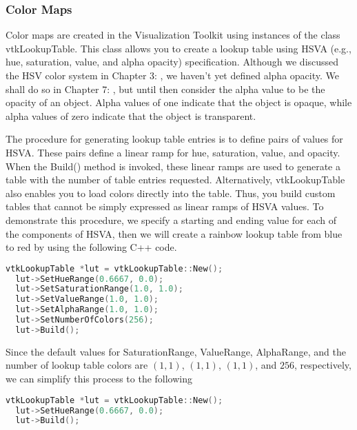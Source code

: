 \begin{description}[leftmargin=0cm,labelindent=0cm]
\end{description}

\subsubsection{Color Maps}

Color maps are created in the Visualization Toolkit using instances of the class vtkLookupTable. This class allows you to create a lookup table using HSVA (e.g., hue, saturation, value, and alpha opacity) specification. Although we discussed the HSV color system in Chapter 3: , we haven't yet defined alpha opacity. We shall do so in Chapter 7:  , but until then consider the alpha value to be the opacity of an object. Alpha values of one indicate that the object is opaque, while alpha values of zero indicate that the object is transparent.

The procedure for generating lookup table entries is to define pairs of values for HSVA. These pairs define a linear ramp for hue, saturation, value, and opacity. When the Build() method is invoked, these linear ramps are used to generate a table with the number of table entries requested. Alternatively, vtkLookupTable also enables you to load colors directly into the table. Thus, you build custom tables that cannot be simply expressed as linear ramps of HSVA values. To demonstrate this procedure, we specify a starting and ending value for each of the components of HSVA, then we will create a rainbow lookup table from blue to red by using the following C++ code.

\begin{lstlisting}[language=C++, caption={Create a rainbow lookup table.}]
vtkLookupTable *lut = vtkLookupTable::New();
  lut->SetHueRange(0.6667, 0.0);
  lut->SetSaturationRange(1.0, 1.0);
  lut->SetValueRange(1.0, 1.0);
  lut->SetAlphaRange(1.0, 1.0);
  lut->SetNumberOfColors(256);
  lut->Build();
\end{lstlisting}

Since the default values for SaturationRange, ValueRange, AlphaRange, and the number of lookup table colors are $(1,1)$, $(1,1)$, $(1,1)$, and $256$, respectively, we can simplify this process to the following

\begin{lstlisting}[language=C++, caption={Create a rainbow lookup table (simplified).}]
vtkLookupTable *lut = vtkLookupTable::New();
  lut->SetHueRange(0.6667, 0.0);
  lut->Build();
\end{lstlisting}

